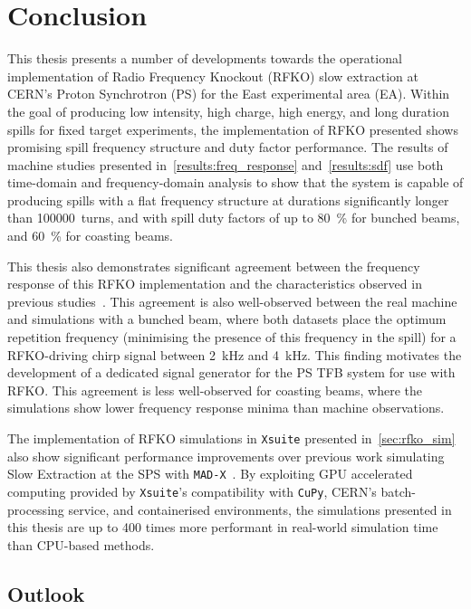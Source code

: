 \documentclass[11pt]{report}
\begin{document}
\chapter{Conclusion}

This thesis presents a number of developments towards the operational implementation of Radio Frequency Knockout (RFKO) slow extraction at CERN's Proton Synchrotron (PS) for the East experimental area (EA). Within the goal of producing low intensity, high charge, high energy, and long duration spills for fixed target experiments, the implementation of RFKO presented shows promising spill frequency structure and duty factor performance. The results of machine studies presented in~\autoref{results:freq_response} and~\autoref{results:sdf} use both time-domain and frequency-domain analysis to show that the system is capable of producing spills with a flat frequency structure at durations significantly longer than \qty{100000}{turns}, and with spill duty factors of up to \qty{80}{\percent} for bunched beams, and \qty{60}{\percent} for coasting beams.

This thesis also demonstrates significant agreement between the frequency response of this RFKO implementation and the characteristics observed in previous studies~\cite{wepmp008,Pari:2780495}. This agreement is also well-observed between the real machine and simulations with a bunched beam, where both datasets place the optimum repetition frequency (minimising the presence of this frequency in the spill) for a RFKO-driving chirp signal between \qty{2}{\kilo\hertz} and \qty{4}{\kilo\hertz}. This finding motivates the development of a dedicated signal generator for the PS TFB system for use with RFKO. 
This agreement is less well-observed for coasting beams, where the simulations show lower frequency response minima than machine observations. 

The implementation of RFKO simulations in \verb|Xsuite| presented in~\autoref{sec:rfko_sim} also show significant performance improvements over previous work simulating Slow Extraction at the SPS with \verb|MAD-X|~\cite{Schicho:2039579}. By exploiting GPU accelerated computing provided by \verb|Xsuite|'s compatibility with \verb|CuPy|, CERN's batch-processing service, and containerised environments, the simulations presented in this thesis are up to 400 times more performant in real-world simulation time than CPU-based methods.

\section{Outlook}
\end{document}
